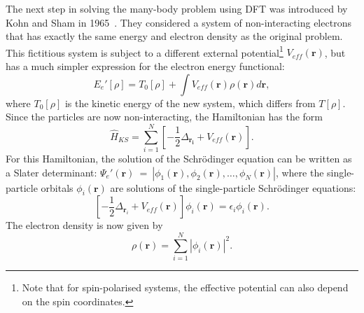 \begin{refsection}
The next step in solving the many-body problem using \gls{DFT} was introduced by 
Kohn and Sham in 1965~\cite{Kohn1965}. They considered a system of 
non-interacting electrons that has exactly the same energy and electron 
density as the original problem. This fictitious system is subject to a 
different external potential\footnote{Note that for spin-polarised systems, 
the effective potential can also depend on the spin coordinates.} 
$V_{eff}(\mathbf{r})$, but has a much simpler expression for the electron 
energy functional: 
\begin{equation}\label{dft:eq-nonE} 
E_{e}'[\rho] = T_0[\rho] + \int V_{eff}(\mathbf{r}) \rho(\mathbf{r}) 
d\mathbf{r}, 
\end{equation} 
where $T_0[\rho]$ is the kinetic energy of the new system, which differs from 
$T[\rho]$. Since the particles are now non-interacting, the Hamiltonian has 
the form 
\begin{equation} 
\hat{H}_{KS} = \sum_{i=1}^{N} \left[ - \frac{1}{2} \Delta_{\mathbf{r_i}} + 
V_{eff}(\mathbf{r}) \right]. 
\end{equation} 
For this Hamiltonian, the solution of the Schr\"odinger equation can be 
written as a Slater determinant: $\Psi_e'(\mathbf{r})~=~\left| 
\phi_1(\mathbf{r}),\phi_2(\mathbf{r}), \hdots , \phi_N (\mathbf{r})\right|$, 
where the single-particle orbitals $\phi_i(\mathbf{r})$ are solutions of the 
single-particle Schr\"odinger equations: 
\begin{equation}\label{dft:eq-KS} 
\left[- \frac{1}{2} \Delta_{\mathbf{r}_i} + V_{eff}(\mathbf{r}) \right] \phi_i 
(\mathbf{r}) = \epsilon_i\phi_i (\mathbf{r}). 
\end{equation} 
The electron density is now given by~\cite{Argaman2002} 
\begin{equation}\label{dft:eq-density} 
\rho(\mathbf{r}) = \sum_{i=1}^N \left|\phi_i(\mathbf{r})\right|^2.
\end{equation} 
 

\end{refsection}
